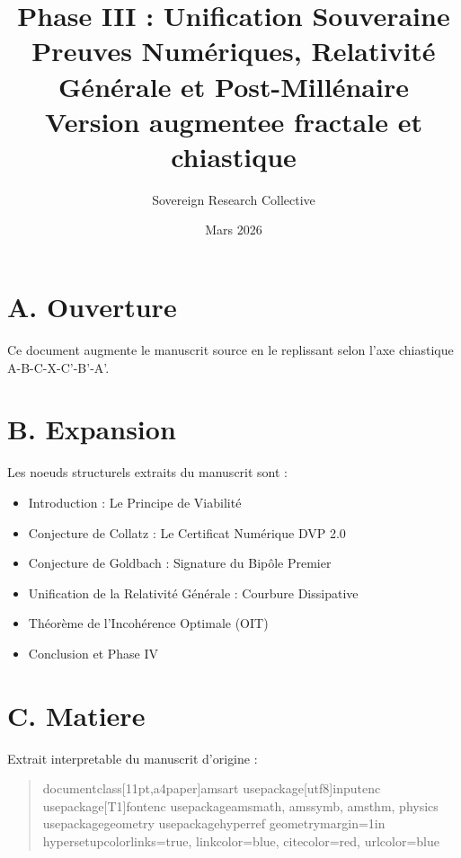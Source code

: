 \documentclass[11pt,a4paper]{article}
\title{Phase III : Unification Souveraine \\ Preuves Numériques, Relativité Générale et Post-Millénaire \\ \large Version augmentee fractale et chiastique}
\author{Sovereign Research Collective}
\date{Mars 2026}
\begin{document}
\maketitle

\section*{A. Ouverture}
Ce document augmente le manuscrit source en le replissant selon l'axe chiastique A-B-C-X-C'-B'-A'.

\section*{B. Expansion}
Les noeuds structurels extraits du manuscrit sont :
\begin{itemize}[leftmargin=1.2cm]
\item Introduction : Le Principe de Viabilité
\item Conjecture de Collatz : Le Certificat Numérique DVP 2.0
\item Conjecture de Goldbach : Signature du Bipôle Premier
\item Unification de la Relativité Générale : Courbure Dissipative
\item Théorème de l'Incohérence Optimale (OIT)
\item Conclusion et Phase IV
\end{itemize}

\section*{C. Matiere}
Extrait interpretable du manuscrit d'origine :
\begin{quote}
documentclass[11pt,a4paper]{amsart} usepackage[utf8]{inputenc} usepackage[T1]{fontenc} usepackage{amsmath, amssymb, amsthm, physics} usepackage{geometry} usepackage{hyperref} geometry{margin=1in} hypersetup{colorlinks=true, linkcolor=blue, citecolor=red, urlcolor=blue} %
\end{quote}
\end{document}
